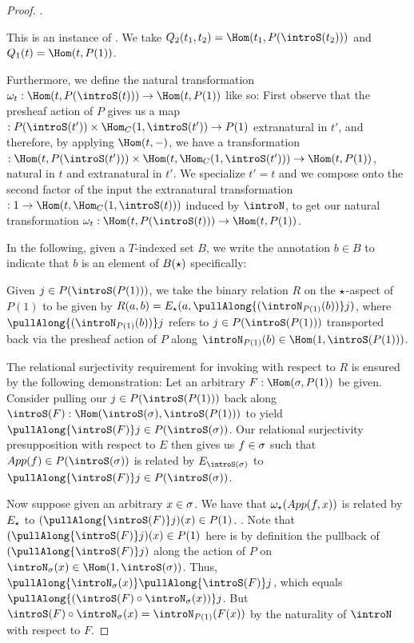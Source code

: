 \begin{proof}
.

This is an instance of . We take $\Bipresheaf(t_1, t_2) = \Hom(t_1, P(\introS(t_2)))$ and $\Unipresheaf(t) = \Hom(t, P(1))$.

Furthermore, we define the natural transformation $\omega_t : \Hom(t, P(\introS(t))) \to \Hom(t, P(1))$ like so:
First observe that the presheaf action of $P$ gives us a map $: P(\introS(t')) \times \Hom_C(1, \introS(t')) \to P(1)$ extranatural in $t'$, and therefore, by applying $\Hom(t, -)$, we have a transformation $: \Hom(t, P(\introS(t'))) \times \Hom(t, \Hom_C(1, \introS(t'))) \to \Hom(t, P(1))$, natural in $t$ and extranatural in $t'$. We specialize $t' = t$ and we compose onto the second factor of the input the extranatural transformation $: 1 \to \Hom(t, \Hom_C(1, \introS(t)))$ induced by $\introN$, to get our natural transformation $\omega_t : \Hom(t, P(\introS(t))) \to \Hom(t, P(1))$.

In the following, given a $T$-indexed set $B$, we write the annotation $b \in B$ to indicate that $b$ is an element of $B(\star)$ specifically:

Given $j \in P(\introS(P(1)))$, we take the binary relation $R$ on the $\star$-aspect of $P(1)$ to be given by $R(a, b) = E_{\point}(a, \pullAlong{( \introN_{P(1)}(b) )} j)$, where $\pullAlong{( \introN_{P(1)}(b) )} j$ refers to $j \in P(\introS(P(1)))$ transported back via the presheaf action of $P$ along $\introN_{P(1)}(b) \in \Hom(1, \introS(P(1)))$.

The relational surjectivity requirement for invoking  with respect to $R$ is ensured by the following demonstration: Let an arbitrary $F : \Hom(\surjSource, P(1))$ be given. Consider pulling our $j \in P(\introS(P(1)))$ back along $\introS(F) : \Hom(\introS(\surjSource), \introS(P(1)))$ to yield $\pullAlong{\introS(F)}j \in P(\introS(\surjSource))$. Our relational surjectivity presupposition with respect to $E$ then gives us $f \in \sigma$ such that $\App(f) \in P(\introS(\surjSource))$ is related by $E_{\introS(\surjSource)}$ to $\pullAlong{\introS(F)}j \in P(\introS(\surjSource))$.

Now suppose given an arbitrary $x \in \sigma$. We have that $\omega_{\star} (App(f, x))$ is related by $E_{\star}$ to $(\pullAlong{\introS(F)}j)(x) \in P(1)$. . Note that $(\pullAlong{\introS(F)}j)(x) \in P(1)$ here is by definition the pullback of $(\pullAlong{\introS(F)}j)$ along the action of $P$ on $\introN_{\surjSource}(x) \in \Hom(1, \introS(\surjSource))$. Thus, $\pullAlong{\introN_{\surjSource}(x)}\pullAlong{\introS(F)}j$, which equals $\pullAlong{( \introS(F) \circ \introN_{\surjSource}(x) )}j$. But $\introS(F) \circ \introN_{\surjSource}(x) = \introN_{P(1)}(F(x))$ by the naturality of $\introN$ with respect to $F$.


\end{proof}
